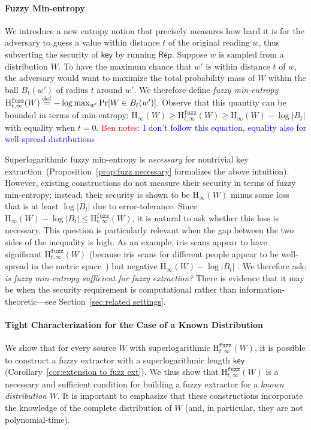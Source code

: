 \documentclass[11pt]{article}
\newcommand{\secref}[1]{\mbox{Section~\ref{#1}}}
\newcommand{\corref}[1]{\mbox{Corollary~\ref{#1}}}
\newcommand{\propref}[1]{\mbox{Proposition~\ref{#1}}}
\newcommand{\class}[1]{{\ensuremath{\mathsf{#1}}}}
\newcommand{\key}{\ensuremath{\class{key}}\xspace}
\newcommand{\rep}{\ensuremath{\class{Rep}}\xspace}
\newcommand{\eqdef}{\stackrel{\rm def}{=}}
\newcommand{\Hoo}{\mathrm{H}_\infty}
\newcommand{\Hfuzz}{\mathrm{H}^{\mathtt{fuzz}}_{t,\infty}}
\newcommand{\authnote}[2]{{\textcolor{red}{\textsf{#1 notes: }\textcolor{blue}{ #2}}\marginpar{\textcolor{red}{\textbf{!!!!!}}}}}
\newcommand{\authnote}[2]{}
\newcommand{\bnote}[1]{{\authnote{Ben}{#1}}}
\begin{document}
\paragraph{Fuzzy Min-entropy}
We introduce a new entropy notion that precisely measures how hard it is for the adversary to guess a value within distance $t$ of the original reading $w$, thus subverting the security of $\key$ by running $\rep$. Suppose $w$ is sampled from a distribution $W$.   To have the maximum chance that $w'$ is within distance $t$ of $w$, the adversary would want to maximize the total probability mass of $W$ within the ball $B_t(w')$ of radius $t$ around $w'$.
We  therefore define \emph{fuzzy min-entropy} $\Hfuzz(W) \eqdef -\log \max_{w'} \Pr[W\in B_t(w')]$.  Observe that this quantity can be bounded in terms of min-entropy: $\Hoo(W) \ge \Hfuzz(W) \ge \Hoo(W)-\log |B_t|$ with equality when $t=0$. \bnote{I don't follow this equation, equality also for well-spread distributions}

Superlogarithmic fuzzy min-entropy  is \emph{necessary} for nontrivial key extraction~(\propref{prop:fuzz necessary} formalizes the above intuition). 
However, existing constructions do not measure their security in terms of fuzzy min-entropy; instead, their security is shown to be  $\Hoo(W)$ minus some loss that is at least $\log |B_t|$ due to error-tolerance. Since $\Hoo(W)-\log |B_t| \le \Hfuzz(W)$, it is natural to ask whether this loss is necessary. This question is particularly relevant when the gap between the two sides of the inequality is high.  As an example, iris scans appear to have significant $\Hfuzz(W)$ (because iris scans for different people appear to be well-spread in the metric space~\cite{daugman2006probing}) but negative $\Hoo(W) -\log |B_t|$ \cite[Section 5]{blanton2009biometric}. We therefore ask: \emph{is fuzzy min-entropy sufficient for fuzzy extraction?} There is evidence that it may be when the security requirement is computational rather than information-theoretic---see \secref{sec:related settings}. 



\paragraph{Tight Characterization for the Case of a Known Distribution}
We show that for every source $W$ with superlogarithmic $\Hfuzz(W)$, it is possible to construct a fuzzy extractor with a superlogarithmic length $\key$ (\corref{cor:extension to fuzz ext}). We thus show that $\Hfuzz(W)$ is a necessary and sufficient condition for building a fuzzy extractor for a \emph{known distribution} $W$.  It is important to emphasize that these constructions incorporate the knowledge of the complete distribution of $W$ (and, in particular, they are not polynomial-time).
\end{document}
